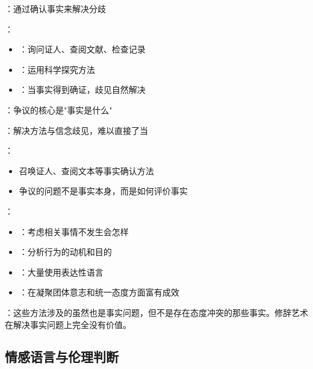\begin{theorembox}[title=信念歧见的解决策略]
：通过确认事实来解决分歧

：
\begin{itemize}
  \item {}：询问证人、查阅文献、检查记录
  \item {}：运用科学探究方法
  \item {}：当事实得到确证，歧见自然解决
\end{itemize}

：争议的核心是"事实是什么"
\end{theorembox}

\begin{theorembox}[title=态度歧见的解决策略]
：解决方法与信念歧见，难以直接了当

：
\begin{itemize}
  \item 召唤证人、查阅文本等事实确认方法
  \item 争议的问题不是事实本身，而是如何评价事实
\end{itemize}

：
\begin{itemize}
  \item {}：考虑相关事情不发生会怎样
  \item {}：分析行为的动机和目的
  \item {}：大量使用表达性语言
  \item {}：在凝聚团体意志和统一态度方面富有成效
\end{itemize}

：这些方法涉及的虽然也是事实问题，但不是存在态度冲突的那些事实。修辞艺术在解决事实问题上完全没有价值。
\end{theorembox}

\subsection{情感语言与伦理判断}

